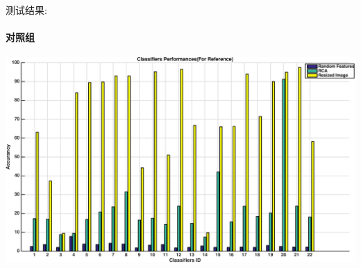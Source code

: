 测试结果:

\paragraph{对照组}

	\begin{center}
	\begin{minipage}[t]{\linewidth}
	\center
	{
	\includegraphics[width=\textwidth]{Img/pni_res_ref.pdf} 
	}
	\end{minipage}
	\medskip
	\end{center}
	
